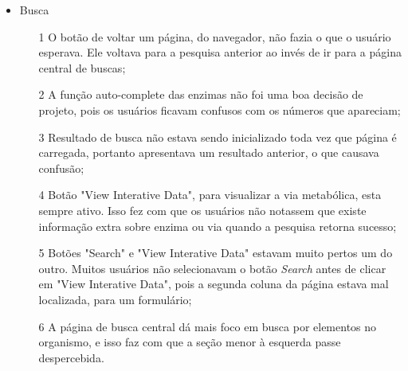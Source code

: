 \begin{itemize}
\item Busca
  \begin{itemize}
  \item[1] O botão de voltar um página, do navegador, não fazia o que o usuário esperava. Ele voltava para a pesquisa anterior ao invés de ir para a página central de buscas;
  \item[2] A função auto-complete das enzimas não foi uma boa decisão de projeto, pois os usuários ficavam confusos com os números que apareciam;
  \item[3] Resultado de busca não estava sendo inicializado toda vez que página é carregada, portanto apresentava um resultado anterior, o que causava confusão;
  \item[4] Botão "View Interative Data", para visualizar a via metabólica, esta sempre ativo. Isso fez com que os usuários não notassem que existe informação extra sobre enzima ou via quando a pesquisa retorna sucesso;
  \item[5] Botões "Search" e "View Interative Data" estavam muito pertos um do outro. Muitos usuários não selecionavam o botão \textit{Search} antes de clicar em "View Interative Data", pois a segunda coluna da página estava mal localizada, para um formulário;
  \item[6] A página de busca central dá mais foco em busca por elementos no organismo, e isso faz com que a seção menor à esquerda passe despercebida.
  \end{itemize}


\end{itemize}

